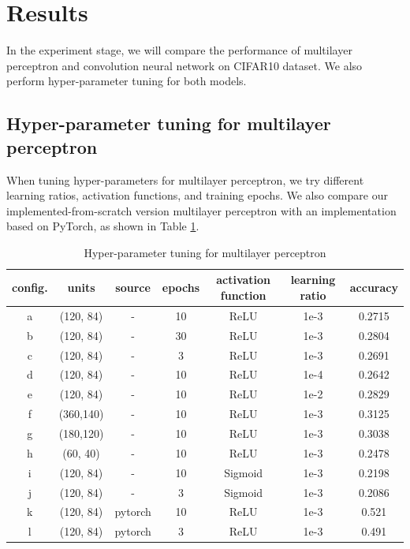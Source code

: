 \documentclass[11pt]{scrartcl}
\begin{document}
\section{Results}
In the experiment stage, we will compare the performance of multilayer perceptron and convolution neural network on CIFAR10 dataset\cite{krizhevsky2009learning}. We also perform hyper-parameter tuning for both models.


\subsection{Hyper-parameter tuning for multilayer perceptron}
When tuning hyper-parameters for multilayer perceptron, we try different learning ratios, activation functions, and training epochs. We also compare our implemented-from-scratch version multilayer perceptron with an implementation based on PyTorch, as shown in Table \ref{MLP}.


\begin{table}[H]
	\centering
	\begin{tabular}{c|cccccc}
		\hline
		  config. & units & source & epochs & activation function & learning ratio & accuracy  \\
		\hline
		  a & (120, 84) & - & 10 & ReLU & 1e-3 & 0.2715 \\
		 \hline
		  b & (120, 84) & - & 30 & ReLU & 1e-3 & 0.2804 \\
		  c & (120, 84) & - & 3  & ReLU & 1e-3 & 0.2691 \\
		 \hline
		  d & (120, 84) & - & 10 & ReLU & 1e-4 & 0.2642 \\
		  e & (120, 84) & - & 10 & ReLU & 1e-2 & 0.2829 \\
		 \hline
		  f & (360,140) & - & 10 & ReLU & 1e-3 & 0.3125 \\
		  g & (180,120) & - & 10 & ReLU & 1e-3 & 0.3038 \\
		  h & (60, 40)  & - & 10 & ReLU & 1e-3 & 0.2478 \\
		 \hline
		  i & (120, 84) & - & 10 & Sigmoid & 1e-3 & 0.2198 \\
		  j & (120, 84) & - & 3  & Sigmoid & 1e-3 & 0.2086 \\
		 \hline
		  k & (120, 84) & pytorch & 10 & ReLU & 1e-3 & 0.521 \\
		  l & (120, 84) & pytorch & 3  & ReLU & 1e-3 & 0.491 \\
		\hline
	\end{tabular} 
	\caption{Hyper-parameter tuning for multilayer perceptron}
	\label{MLP}
\end{table}
\end{document}
